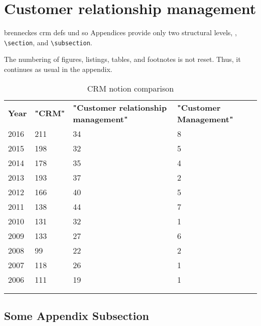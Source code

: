 \section{Customer relationship management}\label{sec:appendix01}

brenneckes crm defs und so 
Appendices provide only two structural levels, \viz, \texttt{\textbackslash section}, and \texttt{\textbackslash subsection}.

The numbering of figures, listings, tables, and footnotes is not reset. Thus, it continues as usual in the appendix.

\begin{table}[]
	\centering
	\caption{CRM notion comparison}
	\label{tab:crmnotions}
	\begin{tabular}{llll}
		\textbf{Year} & \textbf{"CRM"} & \textbf{"Customer relationship management"} & \textbf{"Customer Management"} \\
		2016          & 211            & 34                                          & 8                              \\
		2015          & 198            & 32                                          & 5                              \\
		2014          & 178            & 35                                          & 4                              \\
		2013          & 193            & 37                                          & 2                              \\
		2012          & 166            & 40                                          & 5                              \\
		2011          & 138            & 44                                          & 7                              \\
		2010          & 131            & 32                                          & 1                              \\
		2009          & 133            & 27                                          & 6                              \\
		2008          & 99             & 22                                          & 2                              \\
		2007          & 118            & 26                                          & 1                              \\
		2006          & 111           & 19                                          & 1                              \\
		&                &                                             &                                \\
		&                &                                             &                               
	\end{tabular}
\end{table}



\subsection{Some Appendix Subsection}

\lipsum[10]